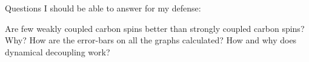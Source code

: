 Questions I should be able to answer for my defense:

Are few weakly coupled carbon spins better than strongly coupled carbon spins? Why?
How are the error-bars on all the graphs calculated?
How and why does dynamical decoupling work?
